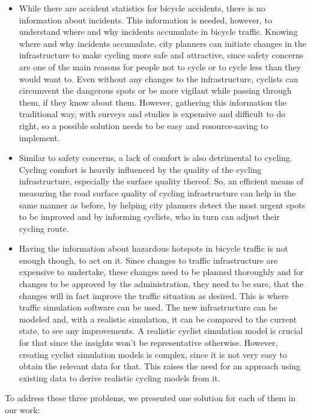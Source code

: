 \begin{itemize}
\item While there are accident statistics for bicycle accidents, there is no information about incidents.
This information is needed, however, to understand where and why incidents accumulate in bicycle traffic.
Knowing where and why incidents accumulate, city planners can initiate changes in the infrastructure to make cycling more safe and attractive, since safety concerns are one of the main reasons for people not to cycle or to cycle less than they would want to.
Even without any changes to the infrastructure, cyclists can circumvent the dangerous spots or be more vigilant while passing through them, if they know about them.
However, gathering this information the traditional way, with surveys and studies is expensive and difficult to do right, so a possible solution needs to be easy and resource-saving to implement.
\item Similar to safety concerns, a lack of comfort is also detrimental to cycling.
Cycling comfort is heavily influenced by the quality of the cycling infrastructure, especially the surface quality thereof.
So, an efficient means of measuring the road surface quality of cycling infrastructure can help in the same manner as before, by helping city planners detect the most urgent spots to be improved and by informing cyclists, who in turn can adjust their cycling route.
\item Having the information about hazardous hotspots in bicycle traffic is not enough though, to act on it.
Since changes to traffic infrastructure are expensive to undertake, these changes need to be planned thoroughly and for changes to be approved by the administration, they need to be sure, that the changes will in fact improve the traffic situation as desired.
This is where traffic simulation software can be used.
The new infrastructure can be modeled and, with a realistic simulation, it can be compared to the current state, to see any improvements.
A realistic cyclist simulation model is crucial for that since the insights won't be representative otherwise.
However, creating cyclist simulation models is complex, since it is not very easy to obtain the relevant data for that.
This raises the need for an approach using existing data to derive realistic cycling models from it.
\end{itemize}

To address these three problems, we presented one solution for each of them in our work:

